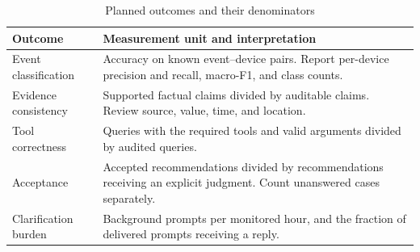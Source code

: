 \begin{table}[t]
\centering\footnotesize
\caption{Planned outcomes and their denominators}
\label{tab:metrics}
\begin{tabularx}{\columnwidth}{@{}p{}Y@{}}
\toprule
Outcome & Measurement unit and interpretation\\
\midrule
Event classification & Accuracy on known event--device pairs. Report per-device precision and recall, macro-F1, and class counts.\\
Evidence consistency & Supported factual claims divided by auditable claims. Review source, value, time, and location.\\
Tool correctness & Queries with the required tools and valid arguments divided by audited queries.\\
Acceptance & Accepted recommendations divided by recommendations receiving an explicit judgment. Count unanswered cases separately.\\
Clarification burden & Background prompts per monitored hour, and the fraction of delivered prompts receiving a reply.\\
\bottomrule
\end{tabularx}
\end{table}
